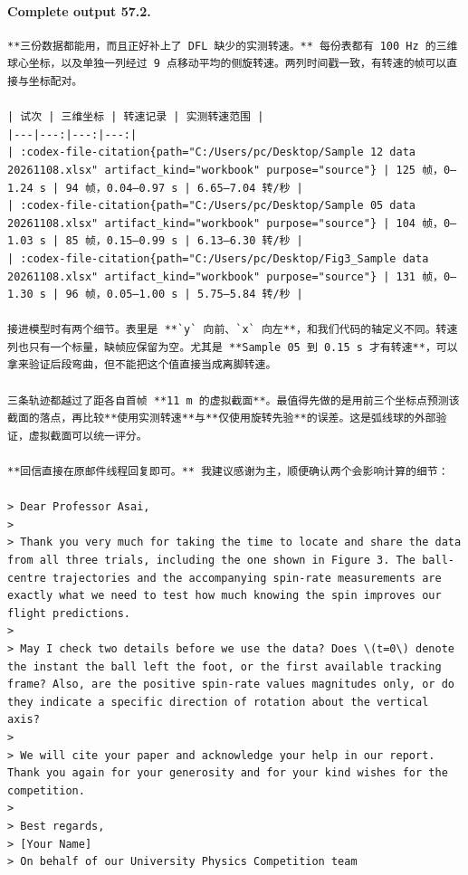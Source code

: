 \documentclass[UTF8,10pt]{ctexart}
\begin{document}
\paragraph{Complete output 57.2.}
\begin{Verbatim}[breaklines=true,breakanywhere=true,fontsize=\scriptsize,frame=single,framesep=2pt]
**三份数据都能用，而且正好补上了 DFL 缺少的实测转速。** 每份表都有 100 Hz 的三维球心坐标，以及单独一列经过 9 点移动平均的侧旋转速。两列时间戳一致，有转速的帧可以直接与坐标配对。

| 试次 | 三维坐标 | 转速记录 | 实测转速范围 |
|---|---:|---:|---:|
| :codex-file-citation{path="C:/Users/pc/Desktop/Sample 12 data 20261108.xlsx" artifact_kind="workbook" purpose="source"} | 125 帧，0–1.24 s | 94 帧，0.04–0.97 s | 6.65–7.04 转/秒 |
| :codex-file-citation{path="C:/Users/pc/Desktop/Sample 05 data 20261108.xlsx" artifact_kind="workbook" purpose="source"} | 104 帧，0–1.03 s | 85 帧，0.15–0.99 s | 6.13–6.30 转/秒 |
| :codex-file-citation{path="C:/Users/pc/Desktop/Fig3_Sample data 20261108.xlsx" artifact_kind="workbook" purpose="source"} | 131 帧，0–1.30 s | 96 帧，0.05–1.00 s | 5.75–5.84 转/秒 |

接进模型时有两个细节。表里是 **`y` 向前、`x` 向左**，和我们代码的轴定义不同。转速列也只有一个标量，缺帧应保留为空。尤其是 **Sample 05 到 0.15 s 才有转速**，可以拿来验证后段弯曲，但不能把这个值直接当成离脚转速。

三条轨迹都越过了距各自首帧 **11 m 的虚拟截面**。最值得先做的是用前三个坐标点预测该截面的落点，再比较**使用实测转速**与**仅使用旋转先验**的误差。这是弧线球的外部验证，虚拟截面可以统一评分。

**回信直接在原邮件线程回复即可。** 我建议感谢为主，顺便确认两个会影响计算的细节：

> Dear Professor Asai,
>
> Thank you very much for taking the time to locate and share the data from all three trials, including the one shown in Figure 3. The ball-centre trajectories and the accompanying spin-rate measurements are exactly what we need to test how much knowing the spin improves our flight predictions.
>
> May I check two details before we use the data? Does \(t=0\) denote the instant the ball left the foot, or the first available tracking frame? Also, are the positive spin-rate values magnitudes only, or do they indicate a specific direction of rotation about the vertical axis?
>
> We will cite your paper and acknowledge your help in our report. Thank you again for your generosity and for your kind wishes for the competition.
>
> Best regards,  
> [Your Name]  
> On behalf of our University Physics Competition team
\end{Verbatim}
\end{document}
